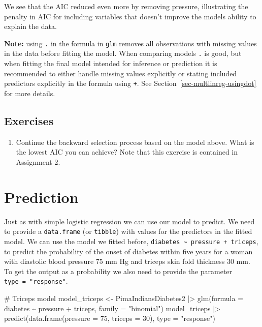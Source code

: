 \documentclass[
  letterpaper,
  DIV=11,
  numbers=noendperiod]{scrreprt}
\newenvironment{Shaded}{\begin{snugshade}}{\end{snugshade}}
\newcommand{\AttributeTok}[1]{\textcolor[rgb]{0.40,0.45,0.13}{#1}}
\newcommand{\CommentTok}[1]{\textcolor[rgb]{0.37,0.37,0.37}{#1}}
\newcommand{\DecValTok}[1]{\textcolor[rgb]{0.68,0.00,0.00}{#1}}
\newcommand{\FunctionTok}[1]{\textcolor[rgb]{0.28,0.35,0.67}{#1}}
\newcommand{\NormalTok}[1]{\textcolor[rgb]{0.00,0.23,0.31}{#1}}
\newcommand{\OtherTok}[1]{\textcolor[rgb]{0.00,0.23,0.31}{#1}}
\newcommand{\SpecialCharTok}[1]{\textcolor[rgb]{0.37,0.37,0.37}{#1}}
\newcommand{\StringTok}[1]{\textcolor[rgb]{0.13,0.47,0.30}{#1}}
\providecommand{\tightlist}{%
  \setlength{\itemsep}{0pt}\setlength{\parskip}{0pt}}\usepackage{longtable,booktabs,array}
\begin{document}
We see that the AIC reduced even more by removing pressure, illustrating
the penalty in AIC for including variables that doesn't improve the
models ability to explain the data.

\textbf{Note:} using \texttt{.} in the formula in \texttt{glm} removes
all observations with missing values in the data before fitting the
model. When comparing models \texttt{.} is good, but when fitting the
final model intended for inference or prediction it is recommended to
either handle missing values explicitly or stating included predictors
explicitly in the formula using \texttt{+}. See
Section~\ref{sec-multlinreg-usingdot} for more details.

\subsection{Exercises}\label{exercises-27}

\begin{enumerate}
\def\labelenumi{\arabic{enumi}.}
\tightlist
\item
  Continue the backward selection process based on the model above. What
  is the lowest AIC you can achieve? Note that this exercise is
  contained in Assignment 2.
\end{enumerate}

\section{Prediction}\label{prediction-2}

Just as with simple logistic regression we can use our model to predict.
We need to provide a \texttt{data.frame} (or \texttt{tibble}) with
values for the predictors in the fitted model. We can use the model we
fitted before,
\texttt{diabetes\ \textasciitilde{}\ pressure\ +\ triceps}, to predict
the probability of the onset of diabetes within five years for a woman
with diastolic blood pressure 75 mm Hg and triceps skin fold thickness
30 mm. To get the output as a probability we also need to provide the
parameter \texttt{type\ =\ "response"}.

\begin{Shaded}
\begin{Highlighting}[]
\CommentTok{\# Triceps model}
\NormalTok{model\_triceps }\OtherTok{\textless{}{-}}\NormalTok{ PimaIndiansDiabetes2 }\SpecialCharTok{|\textgreater{}} 
  \FunctionTok{glm}\NormalTok{(}\AttributeTok{formula =}\NormalTok{ diabetes }\SpecialCharTok{\textasciitilde{}}\NormalTok{ pressure }\SpecialCharTok{+}\NormalTok{ triceps, }\AttributeTok{family =} \StringTok{"binomial"}\NormalTok{)}
\NormalTok{model\_triceps }\SpecialCharTok{|\textgreater{}} \FunctionTok{predict}\NormalTok{(}\FunctionTok{data.frame}\NormalTok{(}\AttributeTok{pressure =} \DecValTok{75}\NormalTok{, }\AttributeTok{triceps =} \DecValTok{30}\NormalTok{), }\AttributeTok{type =} \StringTok{"response"}\NormalTok{)}
\end{Highlighting}
\end{Shaded}
\end{document}
